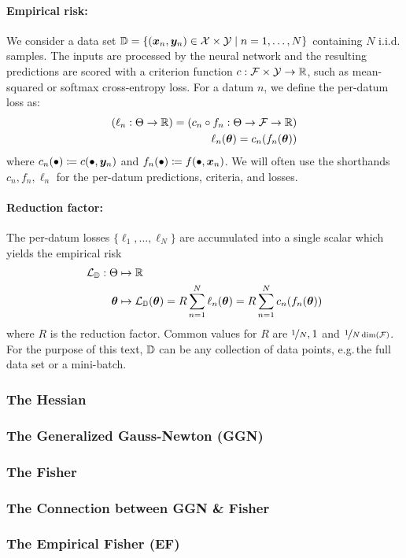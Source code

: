 \paragraph{Empirical risk:} We consider a data set ${\mathbb{D}} = \{({\bm{x}}_n, {\bm{y}}_n) \in {\mathcal{X}} \times {\mathcal{Y}} \mid n = 1, \dots, N \}$ containing $N$ i.i.d.\,samples.
The inputs are processed by the neural network and the resulting predictions are scored with a criterion function $c: {\mathcal{F}} \times {\mathcal{Y}} \to {\mathbb{R}}$, such as mean-squared or softmax cross-entropy loss.
For a datum $n$, we define the per-datum loss as:
\begin{align*}
  (\ell_n: \Theta \to {\mathbb{R}}) = (c_n \circ f_n: \Theta \to {\mathcal{F}} \to {\mathbb{R}})
  \\
  \ell_n({\bm{\theta}}) = c_n(f_n({\bm{\theta}}))
\end{align*}
where $c_n(\bullet) \coloneq c(\bullet, {\bm{y}}_n)$ and $f_n(\bullet) \coloneq f(\bullet, {\bm{x}}_n)$.
We will often use the shorthands $c_n, f_n, \ell_n$ for the per-datum predictions, criteria, and losses.

\paragraph{Reduction factor:} The per-datum losses $\{\ell_1, \dots, \ell_N\}$ are accumulated into a single scalar which yields the empirical risk
\begin{align*}
  {\mathcal{L}}_{{\mathbb{D}}}: \Theta &\mapsto {\mathbb{R}}
  \\
  {\bm{\theta}} &\mapsto {\mathcal{L}}_{{\mathbb{D}}}({\bm{\theta}}) = R \sum_{n=1}^N \ell_n({\bm{\theta}}) = R \sum_{n=1}^N c_n(f_n({\bm{\theta}}))
\end{align*}
where $R$ is the reduction factor. Common values for $R$ are $\nicefrac{1}{N}, 1$ and $\nicefrac{1}{N \dim({\mathcal{F}})}$.
For the purpose of this text, ${\mathbb{D}}$ can be any collection of data points, e.g.\,the full data set or a mini-batch.

\subsubsection{The Hessian}\label{sec:basics_dl_hessian}


\subsubsection{The Generalized Gauss-Newton (GGN)}


\subsubsection{The Fisher}


\subsubsection{The Connection between GGN \& Fisher}
\subsubsection{The Empirical Fisher (EF)}

